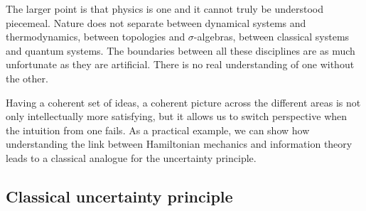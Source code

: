 \documentclass[11pt]{article}
\begin{document}
The larger point is that physics is one and it cannot truly be understood piecemeal. Nature does not separate between dynamical systems and thermodynamics, between topologies and $\sigma$-algebras, between classical systems and quantum systems. The boundaries between all these disciplines are as much unfortunate as they are artificial. There is no real understanding of one without the other.

Having a coherent set of ideas, a coherent picture across the different areas is not only intellectually more satisfying, but it allows us to switch perspective when the intuition from one fails. As a practical example, we can show how understanding the link between Hamiltonian mechanics and information theory leads to a classical analogue for the uncertainty principle.

\subsection*{Classical uncertainty principle}
\end{document}
